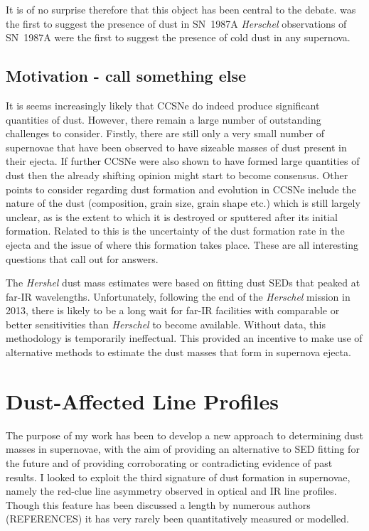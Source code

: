 It is of no surprise therefore that this object has been central to the debate.  \citet{Lucy1989} was the first to suggest the presence of dust in SN~1987A {\em Herschel} observations of SN~1987A were the first to suggest the presence of cold dust in any supernova.



\subsection{Motivation - call something else}

It is seems increasingly likely that CCSNe do indeed produce significant quantities of dust.  However, there remain a large number of outstanding challenges to consider.  Firstly, there are still only a very small number of supernovae that have been observed to have sizeable masses of dust present in their ejecta.  If further CCSNe were also shown to have formed large quantities of dust then  the already shifting opinion might start to become consensus.  Other points to consider regarding dust formation and evolution in CCSNe include the nature of the dust (composition, grain size, grain shape etc.) which is still largely unclear, as is the extent to which it is destroyed or sputtered after its initial formation.  Related to this is the uncertainty of the dust formation rate in the ejecta and the issue of where this formation takes place.  These are all interesting questions that call out for answers.  

The {\em Hershel} dust mass estimates were based on fitting dust SEDs that peaked at far-IR wavelengths. Unfortunately, following the end of the {\em Herschel} mission in 2013, there is likely to be a long wait for far-IR facilities with comparable or better sensitivities than {\em Herschel} to become available.  Without data, this methodology is temporarily ineffectual.  This provided an incentive to make use of alternative methods to estimate the dust masses that form in supernova ejecta.

\section{Dust-Affected Line Profiles}


The purpose of my work has been to develop a new approach to determining dust masses in supernovae, with the aim of providing an alternative to SED fitting for the future and of providing corroborating or contradicting evidence of past results.  I looked to exploit the third signature of dust formation in supernovae, namely the red-clue line asymmetry observed in optical and IR line profiles.  Though this feature has been discussed a length by numerous authors (REFERENCES) it has very rarely been quantitatively measured or modelled.

